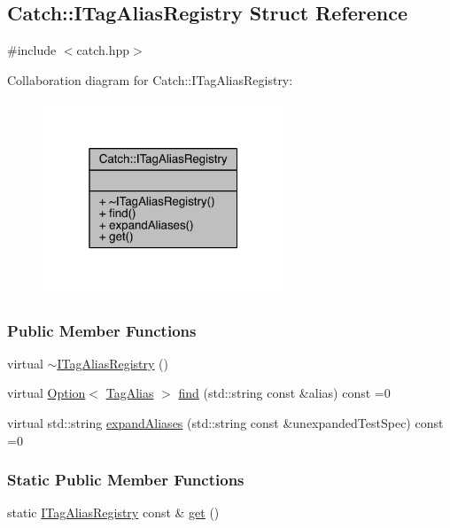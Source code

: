 \hypertarget{a00044}{}\subsection{Catch\+:\+:I\+Tag\+Alias\+Registry Struct Reference}
\label{a00044}


{\ttfamily \#include $<$catch.\+hpp$>$}



Collaboration diagram for Catch\+:\+:I\+Tag\+Alias\+Registry\+:\nopagebreak
\begin{figure}[H]
\begin{center}
\leavevmode
\includegraphics[width=205pt]{a00221}
\end{center}
\end{figure}
\subsubsection*{Public Member Functions}
\begin{DoxyCompactItemize}
\item 
virtual \hyperlink{a00044_a8967db4dd40b68e22697eff0f4928239}{$\sim$\+I\+Tag\+Alias\+Registry} ()
\item 
virtual \hyperlink{a00063}{Option}$<$ \hyperlink{a00084}{Tag\+Alias} $>$ \hyperlink{a00044_a7d2fba4d39cfcc62c2695fcde4f989c3}{find} (std\+::string const \&alias) const =0
\item 
virtual std\+::string \hyperlink{a00044_ae729a7532faf7466db1a157ce0395170}{expand\+Aliases} (std\+::string const \&unexpanded\+Test\+Spec) const =0
\end{DoxyCompactItemize}
\subsubsection*{Static Public Member Functions}
\begin{DoxyCompactItemize}
\item 
static \hyperlink{a00044}{I\+Tag\+Alias\+Registry} const \& \hyperlink{a00044_aa9d0f008f49473389c7abf6071f137a7}{get} ()
\end{DoxyCompactItemize}


